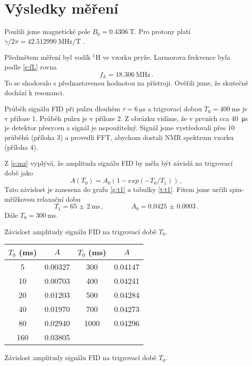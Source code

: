 \section*{Výsledky měření}
Použili jsme magnetické pole $B_0=\SI{0.4306}{\tesla}$. Pro protony platí $\gamma/2\pi=\SI{42.512990}{\MHz\per\tesla}$ \cite{skripta}.

Předmětem měření byl vodík $^1$H ve vzorku pryže. Larmorova frekvence byla podle \eqref{e:fL} rovna
\begin{equation*}
f_L=\SI{18.306}{\MHz} \,.
\end{equation*}
To se shodovalo s přednastavenou hodnotou na přístroji. Ověřili jsme, že skutečně dochází k resonanci.

Průběh signálu FID při pulzu dlouhém $\tau=\SI{6}{\us}$ a trigrovací dobou $T_0=\SI{400}{\ms}$ je v příloze 1. Průběh pulzu je v příloze 2. Z obrázku vidíme, že v prvních cca \SI{40}{\us} je detektor přesycen a signál je nepoužitelný.
Signál jsme vystředovali přes 10 průběhů (příloha 3) a provedli FFT, abychom dostali NMR spektrum vzorku (příloha 4). 



Z \eqref{e:mz} vyplývá, že amplituda signálu FID by měla být závislá na trigrovací době jako
\begin{equation*}
A(T_0)=A_0(1-exp(-T_0/T_1)) \,,
\end{equation*}
Tato závislost je zanesena do grafu \ref{g:t1} a tabulky \ref{t:t1}.
Fitem jsme určili spin-mřížkovou relaxační dobu
\begin{equation*}
T_1=\SI{65(2)}{\ms} \,,\qquad \qquad A_0 = \num{0.0425(3)} \,.
\end{equation*}
Dále $T_0=\SI{300}{\ms}$.

\begin{graph}[htbp] 
\centering

\caption{Závislost amplitudy signálu FID na trigrovací době $T_0$.}
\label{g:t1}
\end{graph}

\begin{tabulka}[htbp]
\centering
\begin{tabular}{cc|cc}
$T_0$ (\si{\ms}) & $A$ & $T_0$ (\si{\ms}) & $A$ \\\hline
5 & \num{0.00327} & 300 & \num{0.04147} \\
10 & \num{0.00703} & 400 & \num{0.04241} \\
20 & \num{0.01203} & 500 & \num{0.04284} \\
40 & \num{0.01970} & 700 & \num{0.04273} \\
80 & \num{0.02940} & 1000 & \num{0.04296} \\
160 & \num{0.03805} & & \\
\end{tabular}
\caption{Závislost amplitudy signálu FID na trigrovací době $T_0$.}
\label{t:t1}
\end{tabulka}


